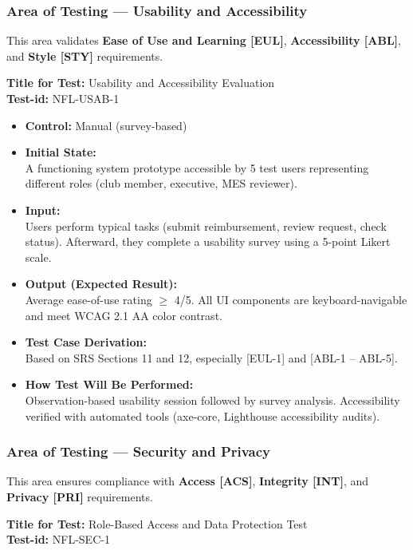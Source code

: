 \documentclass[12pt, titlepage]{article}
\begin{document}
\subsubsection{Area of Testing — Usability and Accessibility}

This area validates \textbf{Ease of Use and Learning [EUL]}, \textbf{Accessibility [ABL]}, and \textbf{Style [STY]} requirements.

\textbf{Title for Test:} Usability and Accessibility Evaluation \\
\textbf{Test-id:} NFL-USAB-1

\begin{itemize}
    \item \textbf{Control:} Manual (survey-based)
    \item \textbf{Initial State:} \\
    A functioning system prototype accessible by 5 test users representing different roles (club member, executive, MES reviewer).
    \item \textbf{Input:} \\
    Users perform typical tasks (submit reimbursement, review request, check status). Afterward, they complete a usability survey using a 5-point Likert scale.
    \item \textbf{Output (Expected Result):} \\
    Average ease-of-use rating $\geq$ 4/5. All UI components are keyboard-navigable and meet WCAG 2.1 AA color contrast.
    \item \textbf{Test Case Derivation:} \\
    Based on SRS Sections 11 and 12, especially [EUL-1] and [ABL-1 – ABL-5].
    \item \textbf{How Test Will Be Performed:} \\
    Observation-based usability session followed by survey analysis. Accessibility verified with automated tools (axe-core, Lighthouse accessibility audits).
\end{itemize}

\subsubsection{Area of Testing — Security and Privacy}

This area ensures compliance with \textbf{Access [ACS]}, \textbf{Integrity [INT]}, and \textbf{Privacy [PRI]} requirements.

\textbf{Title for Test:} Role-Based Access and Data Protection Test \\
\textbf{Test-id:} NFL-SEC-1
\end{document}

